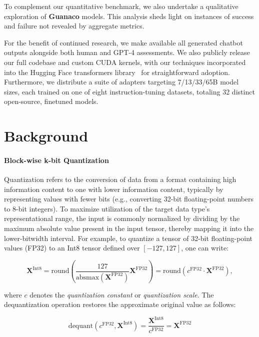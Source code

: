 To complement our quantitative benchmark, we also undertake a qualitative exploration of \textbf{Guanaco} models. This analysis sheds light on instances of success and failure not revealed by aggregate metrics.

For the benefit of continued research, we make available all generated chatbot outputs alongside both human and GPT-4 assessments. We also publicly release our full codebase and custom CUDA kernels, with our techniques incorporated into the Hugging Face transformers library~\citep{wolf2019huggingface} for straightforward adoption. Furthermore, we distribute a suite of adapters targeting 7/13/33/65B model sizes, each trained on one of eight instruction-tuning datasets, totaling 32 distinct open-source, finetuned models.

\section{Background}
\paragraph{Block-wise k-bit Quantization} Quantization refers to the conversion of data from a format containing high information content to one with lower information content, typically by representing values with fewer bits (e.g., converting 32-bit floating-point numbers to 8-bit integers). To maximize utilization of the target data type's representational range, the input is commonly normalized by dividing by the maximum absolute value present in the input tensor, thereby mapping it into the lower-bitwidth interval. For example, to quantize a tensor of 32-bit floating-point values (FP32) to an Int8 tensor defined over $[-127, 127]$, one can write:

\begin{equation}
    \mathbf{X}^{ \text{Int8}} = \text{round}\left( \frac{127}{{\text{absmax}}(\mathbf{X}^{{\text{FP32}}})}\mathbf{X}^{{\text{FP32}}} \right) = \text{round}(c^{\text{FP32}}\cdot \mathbf{X}^{{\text{FP32}}}),
\end{equation}

where $c$ denotes the {\em quantization constant} or {\em quantization scale}. The dequantization operation restores the approximate original value as follows:

\begin{equation}
    \text{dequant}(c^{\text{FP32}}, \mathbf{X}^{\text{Int8}}) = \frac{\mathbf{X}^{\text{Int8}}}{c^{\text{FP32}}} = \mathbf{X}^{\text{FP32}}
\end{equation}

